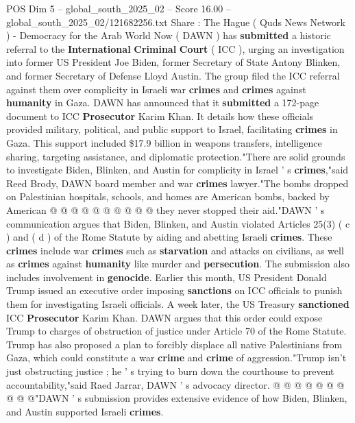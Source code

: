 \begin{textsample}{POS Dim 5 – global\_south\_2025\_02 – Score 16.00 – global\_south\_2025\_02/121682256.txt}  \label{ex:f5_pos_146}
Share : The Hague ( Quds News Network ) - Democracy for the Arab World Now ( DAWN ) has \textbf{submitted} a historic referral to the \textbf{International} \textbf{Criminal} \textbf{Court} ( ICC ), urging an investigation into former US President Joe Biden, former Secretary of State Antony Blinken, and former Secretary of Defense Lloyd Austin.
The group filed the ICC referral against them over complicity in Israeli war \textbf{crimes} and \textbf{crimes} against \textbf{humanity} in Gaza.
DAWN has announced that it \textbf{submitted} a 172-page document to ICC \textbf{Prosecutor} Karim Khan.
It details how these officials provided military, political, and public support to Israel, facilitating \textbf{crimes} in Gaza.
This support included \$17.9 billion in weapons transfers, intelligence sharing, targeting assistance, and diplomatic protection."There are solid grounds to investigate Biden, Blinken, and Austin for complicity in Israel ' s \textbf{crimes},"said Reed Brody, DAWN board member and war \textbf{crimes} lawyer."The bombs dropped on Palestinian hospitals, schools, and homes are American bombs, backed by American @ @ @ @ @ @ @ @ @ @ they never stopped their aid."DAWN ' s communication argues that Biden, Blinken, and Austin violated Articles 25(3) ( c ) and ( d ) of the Rome Statute by aiding and abetting Israeli \textbf{crimes}.
These \textbf{crimes} include war \textbf{crimes} such as \textbf{starvation} and attacks on civilians, as well as \textbf{crimes} against \textbf{humanity} like murder and \textbf{persecution}.
The submission also includes involvement in \textbf{genocide}.
Earlier this month, US President Donald Trump issued an executive order imposing \textbf{sanctions} on ICC officials to punish them for investigating Israeli officials.
A week later, the US Treasury \textbf{sanctioned} ICC \textbf{Prosecutor} Karim Khan.
DAWN argues that this order could expose Trump to charges of obstruction of justice under Article 70 of the Rome Statute.
Trump has also proposed a plan to forcibly displace all native Palestinians from Gaza, which could constitute a war \textbf{crime} and \textbf{crime} of aggression."Trump isn't just obstructing justice ; he ' s trying to burn down the courthouse to prevent accountability,"said Raed Jarrar, DAWN ' s advocacy director. @ @ @ @ @ @ @ @ @ @"DAWN ' s submission provides extensive evidence of how Biden, Blinken, and Austin supported Israeli \textbf{crimes}.

\end{textsample}
